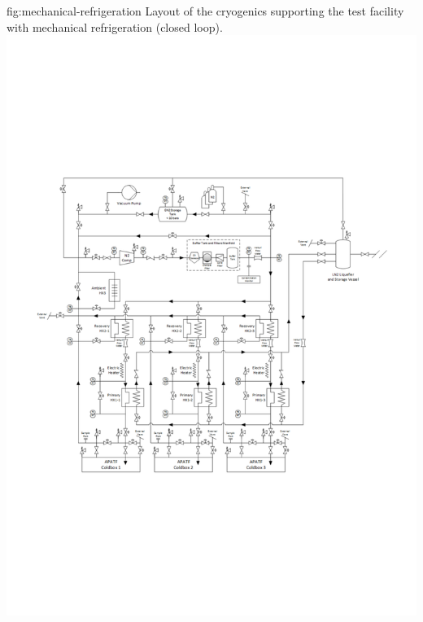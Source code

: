 \begin{dunefigure}{fig:mechanical-refrigeration}
  {Layout of the cryogenics supporting the  test facility with mechanical refrigeration (closed loop).}
\includegraphics[width=.98\textwidth]{graphics/Cryo-cold-box-mechanical.pdf}
\end{dunefigure}

